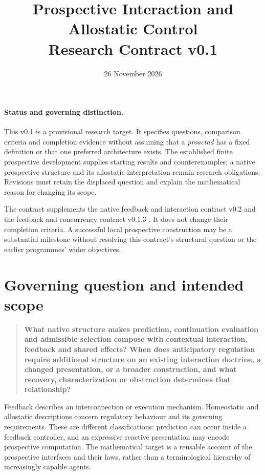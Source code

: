 \documentclass[11pt]{article}
\title{Prospective Interaction and Allostatic Control\\Research Contract v0.1}
\author{}
\date{26 November 2026}
\begin{document}
\maketitle

\paragraph{Status and governing distinction.}
This v0.1 is a provisional research target. It specifies questions, comparison criteria and completion evidence without assuming that a \emph{proactad} has a fixed definition or that one preferred architecture exists. The established finite prospective development supplies starting results and counterexamples; a native prospective structure and its allostatic interpretation remain research obligations. Revisions must retain the displaced question and explain the mathematical reason for changing its scope.

The contract supplements the native feedback and interaction contract v0.2 and the feedback and concurrency contract v0.1.3 \cite{contracts}. It does not change their completion criteria. A successful local prospective construction may be a substantial milestone without resolving this contract's structural question or the earlier programmes' wider objectives.

\section{Governing question and intended scope}\label{sec:question}

\begin{quote}
\textbf{What native structure makes prediction, continuation evaluation and admissible selection compose with contextual interaction, feedback and shared effects? When does anticipatory regulation require additional structure on an existing interaction doctrine, a changed presentation, or a broader construction, and what recovery, characterization or obstruction determines that relationship?}
\end{quote}

Feedback describes an interconnection or execution mechanism. Homeostatic and allostatic descriptions concern regulatory behaviour and its governing requirements. These are different classifications: prediction can occur inside a feedback controller, and an expressive reactive presentation may encode prospective computation. The mathematical target is a reusable account of the prospective interfaces and their laws, rather than a terminological hierarchy of increasingly capable agents.
\end{document}
